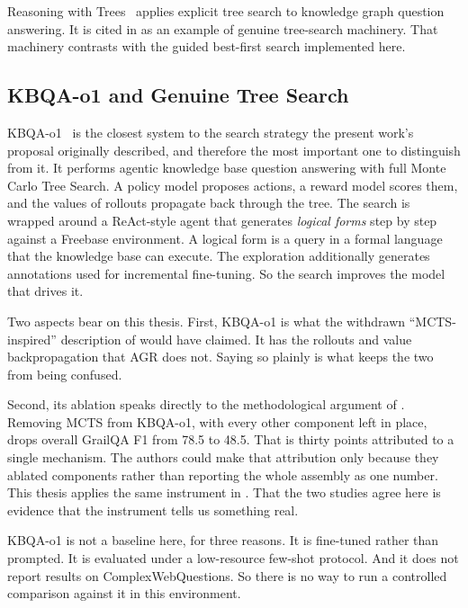 Reasoning with Trees~\cite{shen2025reasoning} applies explicit tree search to
knowledge graph question answering. It is cited in 
as an example of genuine tree-search machinery. That machinery contrasts with
the guided best-first search implemented here.

\subsection{KBQA-o1 and Genuine Tree Search}\label{sec:kbqao1}

KBQA-o1~\cite{luo2025kbqao1} is the closest system to the search strategy the
present work's proposal originally described, and therefore the most important
one to distinguish from it. It performs agentic knowledge base question
answering with full Monte Carlo Tree Search. A policy model proposes actions, a
reward model scores them, and the values of rollouts propagate back through the
tree. The search is wrapped around a ReAct-style agent that generates
\emph{logical forms} step by step against a Freebase environment. A logical form
is a query in a formal language that the knowledge base can execute. The
exploration additionally generates annotations used for incremental fine-tuning.
So the search improves the model that drives it.

Two aspects bear on this thesis. First, KBQA-o1 is what the withdrawn
``MCTS-inspired'' description of  would have
claimed. It has the rollouts and value backpropagation that AGR does not. Saying
so plainly is what keeps the two from being confused.

Second, its ablation speaks directly to the methodological argument of
. Removing MCTS from KBQA-o1, with every other component
left in place, drops overall GrailQA F1 from 78.5 to 48.5. That is thirty points
attributed to a single mechanism. The authors could make that attribution only
because they ablated components rather than reporting the whole assembly as one
number. This thesis applies the same instrument in . That
the two studies agree here is evidence that the instrument tells us something
real.

KBQA-o1 is not a baseline here, for three reasons. It is fine-tuned rather than
prompted. It is evaluated under a low-resource few-shot protocol. And it does
not report results on ComplexWebQuestions. So there is no way to run a
controlled comparison against it in this environment.

